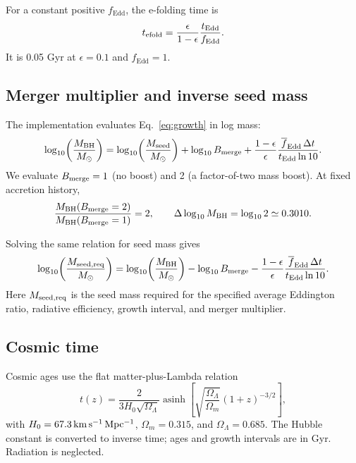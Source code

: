\documentclass[pdflatex,sn-basic]{sn-jnl}
\newcommand{\fedd}{f_{\mathrm{Edd}}}
\newcommand{\mbh}{M_{\mathrm{BH}}}
\newcommand{\mseed}{M_{\mathrm{seed}}}
\begin{document}
For a constant positive $\fedd$, the e-folding time is
\begin{equation}
t_{\rm efold}=\frac{\epsilon}{1-\epsilon}\frac{t_{\rm Edd}}{\fedd}.
\end{equation}
It is 0.05 Gyr at $\epsilon=0.1$ and $\fedd=1$.


\subsection{Merger multiplier and inverse seed mass}

The implementation evaluates Eq.~\ref{eq:growth} in log mass:
\begin{equation}
\log_{10}\!\left(\frac{\mbh}{M_\odot}\right)
=\log_{10}\!\left(\frac{\mseed}{M_\odot}\right)
+\log_{10}B_{\rm merge}
+\frac{1-\epsilon}{\epsilon}
\frac{\overline{f}_{\mathrm{Edd}}\,\Delta t}{t_{\rm Edd}\ln 10}.
\label{eq:merger-implementation}
\end{equation}
We evaluate $B_{\rm merge}=1$ (no boost) and 2 (a factor-of-two mass boost).
At fixed accretion history,
\begin{equation}
\frac{\mbh(B_{\rm merge}=2)}{\mbh(B_{\rm merge}=1)}=2,
\qquad \Delta\log_{10}\mbh=\log_{10}2\simeq0.3010.
\label{eq:merger-shift}
\end{equation}

Solving the same relation for seed mass gives
\begin{equation}
\log_{10}\!\left(\frac{M_{\rm seed,req}}{M_\odot}\right)
=\log_{10}\!\left(\frac{\mbh}{M_\odot}\right)-\log_{10}B_{\rm merge}
-\frac{1-\epsilon}{\epsilon}
\frac{\overline{f}_{\mathrm{Edd}}\,\Delta t}{t_{\rm Edd}\ln 10}.
\label{eq:required-seed}
\end{equation}
Here $M_{\rm seed,req}$ is the seed mass required for the specified average
Eddington ratio, radiative efficiency, growth interval, and merger multiplier.


\subsection{Cosmic time}
\label{app:cosmology}

Cosmic ages use the flat matter-plus-Lambda relation
\begin{equation}
t(z)=\frac{2}{3H_0\sqrt{\Omega_\Lambda}}
\operatorname{asinh}\!\left[\sqrt{\frac{\Omega_\Lambda}{\Omega_m}}
(1+z)^{-3/2}\right],
\label{eq:cosmictime}
\end{equation}
with $H_0=67.3\,{\rm km\,s^{-1}\,Mpc^{-1}}$, $\Omega_m=0.315$, and
$\Omega_\Lambda=0.685$. The Hubble constant is converted to inverse time;
ages and growth intervals are in Gyr. Radiation is neglected.
\end{document}
